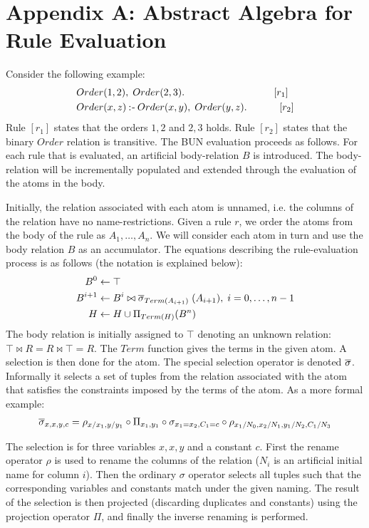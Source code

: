 \section{Appendix A: Abstract Algebra for Rule Evaluation}
Consider the following example:
\begin{align*}
&Order(1, 2),\; Order(2, 3). \quad\quad\quad\quad\quad\quad\quad\quad\quad[r_1]\\
&Order(x, z) \mathbin{:\hspace{-0.5ex}\textsf{-}} Order(x, y),\; Order(y, z). \;\quad\quad\quad[r_2]
\end{align*}
\noindent
Rule $[r_1]$ states that the orders $1, 2$ and $2, 3$ holds. Rule $[r_2]$ states that the binary $Order$ relation is transitive. The BUN evaluation proceeds as follows. For each rule that is evaluated, an artificial body-relation $B$ is introduced. The body-relation will be incrementally populated and extended through the evaluation of the atoms in the body. 

Initially, the relation associated with each atom is unnamed, i.e. the columns of the relation have no name-restrictions. Given a rule $r$, we order the atoms from the body of the rule as $A_1, \ldots, A_n$. We will consider each atom in turn and use the body relation $B$ as an accumulator. The equations describing the rule-evaluation process is as follows (the notation is explained below):
\begin{align*}
B^{0} &\leftarrow \top \\
B^{i + 1} &\leftarrow B^{i} \bowtie \overline{\sigma}_{Term(A_{i + 1})}\;(A_{i + 1}), \; i = 0, \ldots, n - 1\\
H & \leftarrow H \cup \Pi_{Term(H)}(B^n)
\end{align*}
\noindent
The body relation is initially assigned to $\top$ denoting an unknown relation: $\top \bowtie R = R \bowtie \top = R$. The $Term$ function gives the terms in the given atom. A selection is then done for the atom. The special selection operator is denoted $\overline{\sigma}$. Informally it selects a set of tuples from the relation associated with the atom that satisfies the constraints imposed by the terms of the atom. As a more formal example:
\begin{align*}
\overline{\sigma}_{x,x,y,c} = \rho_{x/x_1, y/y_1} \circ \Pi_{x_1, y_1} \circ \sigma_{x_1 = x_2, C_1 = c} \circ \rho_{x_1/N_0, x_2/N_1, y_1/N_2, C_1/N_3}
\end{align*}

The selection is for three variables $x, x, y$ and a constant $c$. First the rename operator $\rho$ is used to rename the columns of the relation ($N_i$ is an artificial initial name for column $i$). Then the ordinary $\sigma$ operator selects all tuples such that the corresponding variables and constants match under the given naming. The result of the selection is then projected (discarding duplicates and constants) using the projection operator $\Pi$, and finally the inverse renaming is performed.

